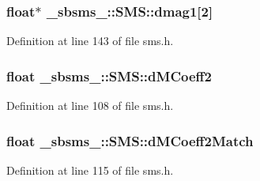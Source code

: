 \subsubsection[{\texorpdfstring{dmag1}{dmag1}}]{\setlength{\rightskip}{0pt plus 5cm}float$\ast$ \+\_\+sbsms\+\_\+\+::\+S\+M\+S\+::dmag1\mbox{[}2\mbox{]}\hspace{0.3cm}{\ttfamily [protected]}}\hypertarget{class__sbsms___1_1_s_m_s_a4808d4a4b8222fb9228598eab1c4108f}{}\label{class__sbsms___1_1_s_m_s_a4808d4a4b8222fb9228598eab1c4108f}


Definition at line 143 of file sms.\+h.

\subsubsection[{\texorpdfstring{d\+M\+Coeff2}{dMCoeff2}}]{\setlength{\rightskip}{0pt plus 5cm}float \+\_\+sbsms\+\_\+\+::\+S\+M\+S\+::d\+M\+Coeff2\hspace{0.3cm}{\ttfamily [protected]}}\hypertarget{class__sbsms___1_1_s_m_s_a352aeafbe990c087aca31c96ca9ce6f4}{}\label{class__sbsms___1_1_s_m_s_a352aeafbe990c087aca31c96ca9ce6f4}


Definition at line 108 of file sms.\+h.

\subsubsection[{\texorpdfstring{d\+M\+Coeff2\+Match}{dMCoeff2Match}}]{\setlength{\rightskip}{0pt plus 5cm}float \+\_\+sbsms\+\_\+\+::\+S\+M\+S\+::d\+M\+Coeff2\+Match\hspace{0.3cm}{\ttfamily [protected]}}\hypertarget{class__sbsms___1_1_s_m_s_a7b19101b415ae8c527fd398356a6d6c3}{}\label{class__sbsms___1_1_s_m_s_a7b19101b415ae8c527fd398356a6d6c3}


Definition at line 115 of file sms.\+h.

